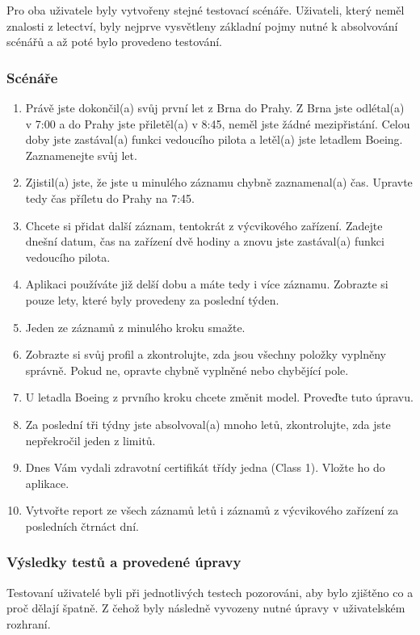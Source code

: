 \documentclass[thesis=M,czech]{FITthesis}[2012/06/26]
\begin{document}
Pro oba uživatele byly vytvořeny stejné testovací scénáře. Uživateli, který neměl znalosti z letectví, byly nejprve vysvětleny základní pojmy nutné k absolvování scénářů a až poté bylo provedeno testování.

\subsubsection{Scénáře}
\begin{enumerate}
\item Právě jste dokončil(a) svůj první let z Brna do Prahy. Z Brna jste odlétal(a) v 7:00 a do Prahy jste přiletěl(a) v 8:45, neměl jste žádné mezipřistání. Celou doby jste zastával(a) funkci vedoucího pilota a letěl(a) jste letadlem Boeing. Zaznamenejte svůj let.
\item Zjistil(a) jste, že jste u minulého záznamu chybně zaznamenal(a) čas. Upravte tedy čas příletu do Prahy na 7:45.
\item Chcete si přidat další záznam, tentokrát z výcvikového zařízení. Zadejte dnešní datum, čas na zařízení dvě hodiny a znovu jste zastával(a) funkci vedoucího pilota.
\item Aplikaci používáte již delší dobu a máte tedy i více záznamu. Zobrazte si pouze lety, které byly provedeny za poslední týden.
\item Jeden ze záznamů z minulého kroku smažte.
\item Zobrazte si svůj profil a zkontrolujte, zda jsou všechny položky vyplněny správně. Pokud ne, opravte chybně vyplněné nebo chybějící pole.
\item U letadla Boeing z prvního kroku chcete změnit model. Proveďte tuto úpravu.
\item Za poslední tři týdny jste absolvoval(a) mnoho letů, zkontrolujte, zda jste nepřekročil jeden z limitů.
\item Dnes Vám vydali zdravotní certifikát třídy jedna (Class 1). Vložte ho do aplikace.
\item Vytvořte report ze všech záznamů letů i záznamů z výcvikového zařízení za posledních čtrnáct dní.
\end{enumerate}

\subsubsection{Výsledky testů a provedené úpravy}
Testovaní uživatelé byli při jednotlivých testech pozorováni, aby bylo zjištěno co a proč dělají špatně. Z čehož byly následně vyvozeny nutné úpravy v uživatelském rozhraní.
\end{document}
